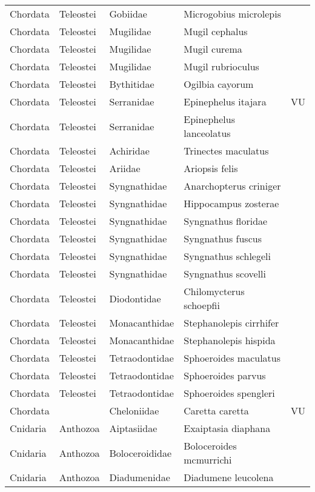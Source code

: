 \begin{longtable}{lllll}
  Chordata & Teleostei & Gobiidae & Microgobius microlepis &  \\ 
  Chordata & Teleostei & Mugilidae & Mugil cephalus &  \\ 
  Chordata & Teleostei & Mugilidae & Mugil curema &  \\ 
  Chordata & Teleostei & Mugilidae & Mugil rubrioculus &  \\ 
  Chordata & Teleostei & Bythitidae & Ogilbia cayorum &  \\ 
  Chordata & Teleostei & Serranidae & Epinephelus itajara & VU \\ 
  Chordata & Teleostei & Serranidae & Epinephelus lanceolatus &  \\ 
  Chordata & Teleostei & Achiridae & Trinectes maculatus &  \\ 
  Chordata & Teleostei & Ariidae & Ariopsis felis &  \\ 
  Chordata & Teleostei & Syngnathidae & Anarchopterus criniger &  \\ 
  Chordata & Teleostei & Syngnathidae & Hippocampus zosterae &  \\ 
  Chordata & Teleostei & Syngnathidae & Syngnathus floridae &  \\ 
  Chordata & Teleostei & Syngnathidae & Syngnathus fuscus &  \\ 
  Chordata & Teleostei & Syngnathidae & Syngnathus schlegeli &  \\ 
  Chordata & Teleostei & Syngnathidae & Syngnathus scovelli &  \\ 
  Chordata & Teleostei & Diodontidae & Chilomycterus schoepfii &  \\ 
  Chordata & Teleostei & Monacanthidae & Stephanolepis cirrhifer &  \\ 
  Chordata & Teleostei & Monacanthidae & Stephanolepis hispida &  \\ 
  Chordata & Teleostei & Tetraodontidae & Sphoeroides maculatus &  \\ 
  Chordata & Teleostei & Tetraodontidae & Sphoeroides parvus &  \\ 
  Chordata & Teleostei & Tetraodontidae & Sphoeroides spengleri &  \\ 
  Chordata &  & Cheloniidae & Caretta caretta & VU \\ 
  Cnidaria & Anthozoa & Aiptasiidae & Exaiptasia diaphana &  \\ 
  Cnidaria & Anthozoa & Boloceroididae & Boloceroides mcmurrichi &  \\ 
  Cnidaria & Anthozoa & Diadumenidae & Diadumene leucolena &  \\ 

\end{longtable}
